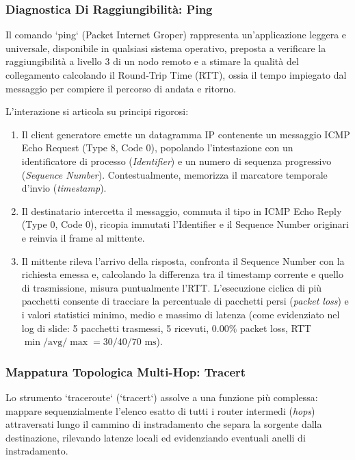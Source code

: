 \documentclass[11pt, a4paper]{article}
\begin{document}
\subsubsection{Diagnostica Di Raggiungibilità: Ping}
Il comando `ping` (Packet Internet Groper) rappresenta un'applicazione leggera e universale, disponibile in qualsiasi sistema operativo, preposta a verificare la raggiungibilità a livello 3 di un nodo remoto e a stimare la qualità del collegamento calcolando il Round-Trip Time (RTT), ossia il tempo impiegato dal messaggio per compiere il percorso di andata e ritorno.


L'interazione si articola su principi rigorosi:
\begin{enumerate}
    \item Il client generatore emette un datagramma IP contenente un messaggio ICMP Echo Request (Type 8, Code 0), popolando l'intestazione con un identificatore di processo (\emph{Identifier}) e un numero di sequenza progressivo (\emph{Sequence Number}). Contestualmente, memorizza il marcatore temporale d'invio (\emph{timestamp}).
    \item Il destinatario intercetta il messaggio, commuta il tipo in ICMP Echo Reply (Type 0, Code 0), ricopia immutati l'Identifier e il Sequence Number originari e reinvia il frame al mittente.
    \item Il mittente rileva l'arrivo della risposta, confronta il Sequence Number con la richiesta emessa e, calcolando la differenza tra il timestamp corrente e quello di trasmissione, misura puntualmente l'RTT. L'esecuzione ciclica di più pacchetti consente di tracciare la percentuale di pacchetti persi (\emph{packet loss}) e i valori statistici minimo, medio e massimo di latenza (come evidenziato nel log di slide: 5 pacchetti trasmessi, 5 ricevuti, $0.00\%$ packet loss, RTT $\min/\text{avg}/\max = 30/40/70 \text{ ms}$).
\end{enumerate}

\subsubsection{Mappatura Topologica Multi-Hop: Tracert}
Lo strumento `traceroute` (`tracert`) assolve a una funzione più complessa: mappare sequenzialmente l'elenco esatto di tutti i router intermedi (\emph{hops}) attraversati lungo il cammino di instradamento che separa la sorgente dalla destinazione, rilevando latenze locali ed evidenziando eventuali anelli di instradamento.
\end{document}
